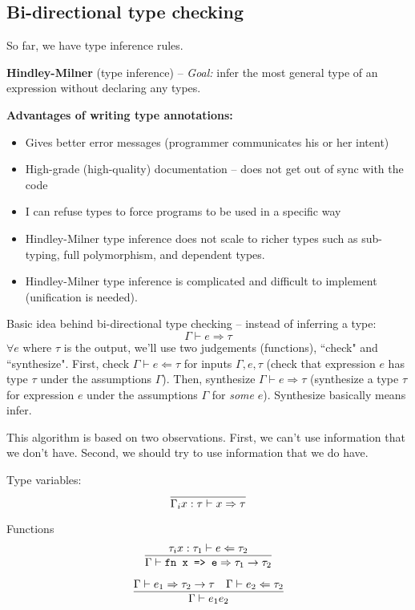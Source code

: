 \documentclass[11pt]{article}
\begin{document}
\subsection{Bi-directional type checking}
So far, we have type inference rules. 

\textbf{Hindley-Milner} (type inference) -- \emph{Goal:} infer the most general type of an expression without declaring any types.

\textbf{Advantages of writing type annotations:}
\begin{itemize}
    \item Gives better error messages (programmer communicates his or her intent)
    \item High-grade (high-quality) documentation -- does not get out of sync with the code
    \item I can refuse types to force programs to be used in a specific way
    \item Hindley-Milner type inference does not scale to richer types such as sub-typing, full polymorphism, and dependent types. 
    \item Hindley-Milner type inference is complicated and difficult to implement (unification is needed).
\end{itemize}

Basic idea behind bi-directional type checking -- instead of inferring a type:
    \[
        \Gamma \vdash e \Rightarrow \tau
    \]
$\forall e$ where $\tau$ is the output, we'll use two judgements (functions), ``check" and ``synthesize". First, check $\Gamma \vdash e \Leftarrow \tau$ for inputs $\Gamma, e, \tau$ (check that expression $e$ has type $\tau$ under the assumptions $\Gamma$). Then, synthesize $\Gamma \vdash e \Rightarrow \tau$ (synthesize a type $\tau$ for expression $e$ under the assumptions $\Gamma$ for \emph{some} $e$). Synthesize basically means infer.

This algorithm is based on two observations. First, we can't use information that we don't have. Second, we should try to use information that we do have. 

Type variables:
\[
    \infer{\Gamma_i x : \tau \vdash x \Rightarrow \tau}{}
\]

Functions
\[
    \infer{\Gamma \vdash \verb~fn x => e~ \Rightarrow \tau_1 \rightarrow \tau_2}{
        \tau_i x : \tau_1 \vdash e \Leftarrow \tau_2
    }
\]

\[
    \infer{\Gamma \vdash e_1 e_2}{
        \Gamma \vdash e_1 \Rightarrow \tau_2 \rightarrow \tau
        &
        \Gamma \vdash e_2 \Leftarrow \tau_2
    }
\]
\end{document}
